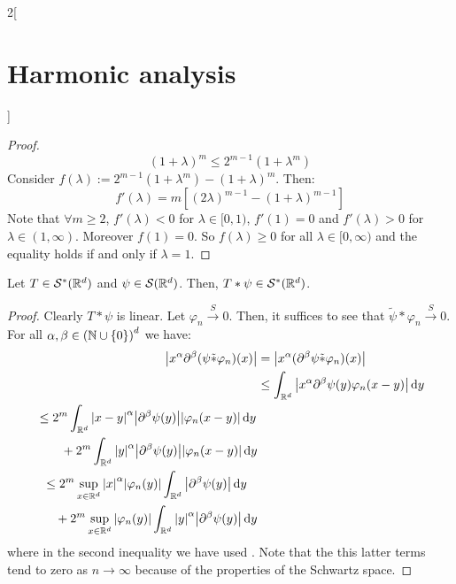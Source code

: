 \documentclass[../../../main_math.tex]{subfiles}
\begin{document}
\begin{multicols}{2}[\section{Harmonic analysis}]
\begin{proof}
$$      {(1+\lambda)}^m\leq 2^{m-1}(1+\lambda^m)
    $$
    Consider $f(\lambda):=2^{m-1}(1+\lambda^m)-{(1+\lambda)}^m$. Then:
    $$
      f'(\lambda)=m\left[{(2\lambda)}^{m-1}-{(1+\lambda)}^{m-1}\right]
    $$
    Note that $\forall m\geq 2$, $f'(\lambda)<0$ for $\lambda\in[0,1)$, $f'(1)=0$ and $f'(\lambda)>0$ for $\lambda\in(1,\infty)$. Moreover $f(1)=0$. So $f(\lambda)\geq 0$ for all $\lambda\in [0,\infty)$ and the equality holds if and only if $\lambda=1$.
  \end{proof}
  \begin{lemma}
    Let $T\in \mathcal{S}^*(\mathbb{R}^d)$ and $\psi\in \mathcal{S}(\mathbb{R}^d)$. Then, $T*\psi\in \mathcal{S}^*(\mathbb{R}^d)$.
  \end{lemma}
  \begin{proof}
    Clearly $T*\psi$ is linear. Let $\varphi_n\overset{S}{\longrightarrow}0$. Then, it suffices to see that $\tilde\psi*\varphi_n\overset{S}{\longrightarrow}0$. For all $\alpha,\beta\in{(\ensuremath{\mathbb{N}}\cup\{0\})}^d$ we have:
    \begin{align*}
      \abs{x^\alpha \partial^\beta(\psi\tilde*\varphi_n)(x)} & =\abs{x^\alpha (\partial^\beta\psi\tilde*\varphi_n)(x)}                    \\
                                                             & \leq \int_{\mathbb{R}^d} \abs{x^\alpha \partial^\beta\psi(y)\varphi_n(x-y)}\dd{y} \\
      \begin{split}
        & \leq 2^m\int_{\mathbb{R}^d} \abs{x-y}^\alpha \abs{\partial^\beta\psi(y)}\abs{\varphi_n(x-y)}\dd{y} \\
        &\qquad+2^m\int_{\mathbb{R}^d} \abs{y}^\alpha\abs{\partial^\beta\psi(y)} \abs{\varphi_n(x-y)}\dd{y} \\
      \end{split}                                       \\
      \begin{split}
        & \leq 2^m\sup_{x\in\mathbb{R}^d}\abs{x}^\alpha\abs{\varphi_n(y)}\int_{\mathbb{R}^d}  \abs{\partial^\beta\psi(y)}\dd{y} \\
        &\quad+2^m\sup_{x\in\mathbb{R}^d}\abs{\varphi_n(y)}\int_{\mathbb{R}^d} \abs{y}^\alpha\abs{\partial^\beta\psi(y)}\dd{y} \\
      \end{split}
    \end{align*}
    where in the second inequality we have used . Note that the this latter terms tend to zero as $n\to\infty$ because of the properties of the Schwartz space.
  \end{proof}

\end{multicols}
\end{document}
